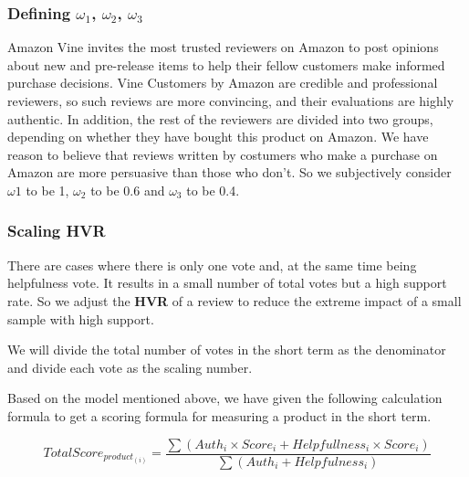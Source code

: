 \documentclass[12pt]{article}  %
\begin{document}
\subsubsection{Defining $\omega_1$, $\omega_2$, $\omega_3$}

Amazon Vine invites the most trusted reviewers on Amazon to post opinions about new and pre-release items to help their fellow customers make informed purchase decisions\cite{www.amazon.com}. Vine Customers by Amazon are credible and professional reviewers, so such reviews are more convincing, and their evaluations are highly authentic. In addition, the rest of the reviewers are divided into two groups, depending on whether they have bought this product on Amazon. We have reason to believe that reviews written by costumers who make a purchase on Amazon are more persuasive than those who don't. So we subjectively consider $\omega1$ to be 1, $\omega_2$ to be 0.6 and $\omega_3$ to be 0.4.

\subsubsection{Scaling HVR}
There are cases where there is only one vote and, at the same time being helpfulness vote. It results in a small number of total votes but a high support rate. So we adjust the \textbf{HVR} of a review to reduce the extreme impact of a small sample with high support.

We will divide the total number of votes in the short term as the denominator and divide each vote as the scaling number.

Based on the model mentioned above, we have given the following calculation formula to get a scoring formula for measuring a product in the short term.

\begin{equation}\label{eq:model1}
Total Score_{product_(i)}=\frac{\sum(Auth_i\times Score_i+Helpfullness_i\times Score_i)}{\sum (Auth_i+Helpfulness_i)}
\end{equation}
\end{document}
